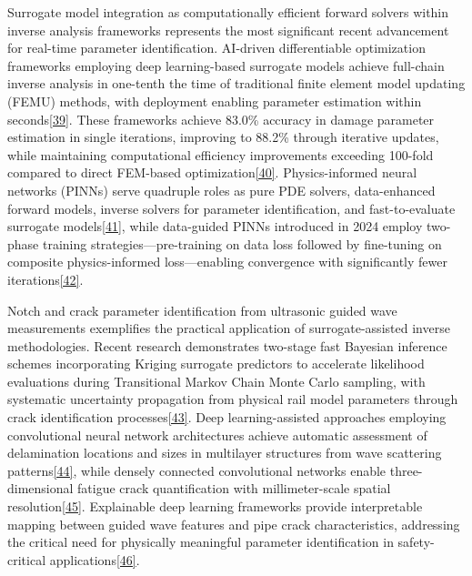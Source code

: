 \documentclass[12pt,a4paper]{report}
\begin{document}
Surrogate model integration as computationally efficient forward solvers within inverse analysis frameworks represents the most significant recent advancement for real-time parameter identification. AI-driven differentiable optimization frameworks employing deep learning-based surrogate models achieve full-chain inverse analysis in one-tenth the time of traditional finite element model updating (FEMU) methods, with deployment enabling parameter estimation within seconds\href{https://www.sciencedirect.com/science/article/abs/pii/S088832702500319X?dgcid=rss_sd_all}{[39]}. These frameworks achieve 83.0\% accuracy in damage parameter estimation in single iterations, improving to 88.2\% through iterative updates, while maintaining computational efficiency improvements exceeding 100-fold compared to direct FEM-based optimization\href{https://www.nature.com/articles/s41598-023-46141-9}{[40]}. Physics-informed neural networks (PINNs) serve quadruple roles as pure PDE solvers, data-enhanced forward models, inverse solvers for parameter identification, and fast-to-evaluate surrogate models\href{https://amses-journal.springeropen.com/articles/10.1186/s40323-024-00265-3}{[41]}, while data-guided PINNs introduced in 2024 employ two-phase training strategies—pre-training on data loss followed by fine-tuning on composite physics-informed loss—enabling convergence with significantly fewer iterations\href{https://arxiv.org/abs/2407.10836}{[42]}.

Notch and crack parameter identification from ultrasonic guided wave measurements exemplifies the practical application of surrogate-assisted inverse methodologies. Recent research demonstrates two-stage fast Bayesian inference schemes incorporating Kriging surrogate predictors to accelerate likelihood evaluations during Transitional Markov Chain Monte Carlo sampling, with systematic uncertainty propagation from physical rail model parameters through crack identification processes\href{https://www.sciencedirect.com/science/article/pii/S0022460X2400676X}{[43]}. Deep learning-assisted approaches employing convolutional neural network architectures achieve automatic assessment of delamination locations and sizes in multilayer structures from wave scattering patterns\href{https://www.sciencedirect.com/science/article/abs/pii/S0041624X24001136}{[44]}, while densely connected convolutional networks enable three-dimensional fatigue crack quantification with millimeter-scale spatial resolution\href{https://www.sciencedirect.com/science/article/abs/pii/S0142112323005959}{[45]}. Explainable deep learning frameworks provide interpretable mapping between guided wave features and pipe crack characteristics, addressing the critical need for physically meaningful parameter identification in safety-critical applications\href{https://www.sciencedirect.com/science/article/abs/pii/S0263224122014737}{[46]}.
\end{document}
